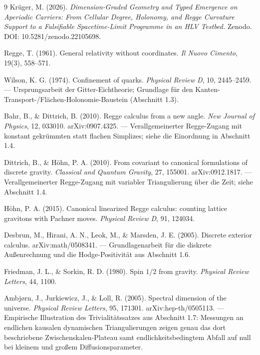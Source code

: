 \begin{thebibliography}{9}
Krüger, M. (2026). \emph{Dimension-Graded Geometry and Typed Emergence on
Aperiodic Carriers: From Cellular Degree, Holonomy, and Regge Curvature
Support to a Falsifiable Spacetime-Limit Programme in an HLV Testbed.}
Zenodo. DOI: 10.5281/zenodo.22105698.

Regge, T. (1961). General relativity without coordinates.
\emph{Il Nuovo Cimento}, 19(3), 558--571.

Wilson, K. G. (1974). Confinement of quarks.
\emph{Physical Review D}, 10, 2445--2459. — Ursprungsarbeit der
Gitter-Eichtheorie; Grundlage für den Kanten-Transport-/Flächen-Holonomie-Baustein
(Abschnitt 1.3).

Bahr, B., \& Dittrich, B. (2010). Regge calculus from a new angle.
\emph{New Journal of Physics}, 12, 033010. arXiv:0907.4325. — Verallgemeinerter
Regge-Zugang mit konstant gekrümmten statt flachen Simplizes; siehe die
Einordnung in Abschnitt 1.4.

Dittrich, B., \& Höhn, P. A. (2010). From covariant to canonical formulations
of discrete gravity. \emph{Classical and Quantum Gravity}, 27, 155001.
arXiv:0912.1817. — Verallgemeinerter Regge-Zugang mit variabler
Triangulierung über die Zeit; siehe Abschnitt 1.4.

Höhn, P. A. (2015). Canonical linearized Regge calculus: counting lattice
gravitons with Pachner moves. \emph{Physical Review D}, 91, 124034.

Desbrun, M., Hirani, A. N., Leok, M., \& Marsden, J. E. (2005). Discrete
exterior calculus. arXiv:math/0508341. — Grundlagenarbeit für die
diskrete Außenrechnung und die Hodge-Positivität aus Abschnitt 1.6.

Friedman, J. L., \& Sorkin, R. D. (1980). Spin $1/2$ from gravity.
\emph{Physical Review Letters}, 44, 1100.

Ambjørn, J., Jurkiewicz, J., \& Loll, R. (2005). Spectral dimension of the
universe. \emph{Physical Review Letters}, 95, 171301. arXiv:hep-th/0505113.
— Empirische Illustration des Trivialitätssatzes aus Abschnitt 1.7:
Messungen an endlichen kausalen dynamischen Triangulierungen zeigen genau
das dort beschriebene Zwischenskalen-Plateau samt endlichkeitsbedingtem
Abfall auf null bei kleinem und großem Diffusionsparameter.


\end{thebibliography}
